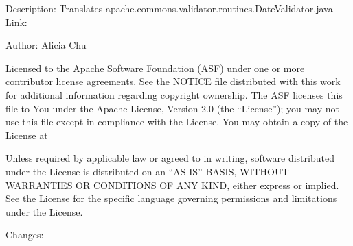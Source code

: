 \documentclass[letterpaper,10pt,english]{sphinxmanual}
\begin{document}
\sphinxAtStartPar
Description: Translates apache.commons.validator.routines.DateValidator.java
Link: 

\sphinxAtStartPar
Author: Alicia Chu
\begin{description}
\sphinxAtStartPar
Licensed to the Apache Software Foundation (ASF) under one or more
contributor license agreements. See the NOTICE file distributed with
this work for additional information regarding copyright ownership.
The ASF licenses this file to You under the Apache License, Version 2.0
(the “License”); you may not use this file except in compliance with
the License. You may obtain a copy of the License at
\begin{quote}

\sphinxAtStartPar
{}
\end{quote}

\sphinxAtStartPar
Unless required by applicable law or agreed to in writing, software
distributed under the License is distributed on an “AS IS” BASIS,
WITHOUT WARRANTIES OR CONDITIONS OF ANY KIND, either express or implied.
See the License for the specific language governing permissions and
limitations under the License.

\end{description}

\sphinxAtStartPar
Changes:
\end{document}

